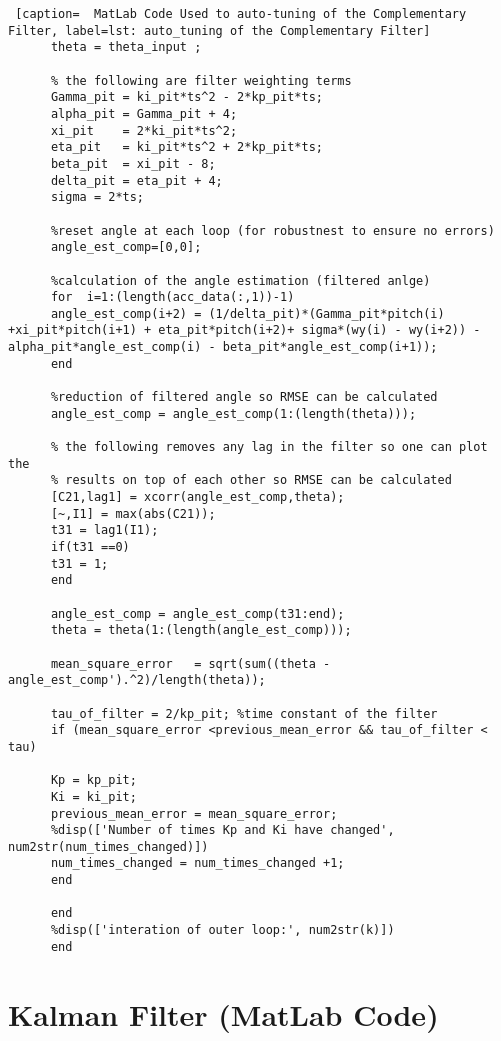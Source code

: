 \begin{lstlisting} [caption=  MatLab Code Used to auto-tuning of the Complementary Filter, label=lst: auto_tuning of the Complementary Filter]
      theta = theta_input ;  
      
      % the following are filter weighting terms 
      Gamma_pit = ki_pit*ts^2 - 2*kp_pit*ts;
      alpha_pit = Gamma_pit + 4;
      xi_pit    = 2*ki_pit*ts^2;
      eta_pit   = ki_pit*ts^2 + 2*kp_pit*ts;
      beta_pit  = xi_pit - 8;
      delta_pit = eta_pit + 4;
      sigma = 2*ts;
      
      %reset angle at each loop (for robustnest to ensure no errors)
      angle_est_comp=[0,0];
      
      %calculation of the angle estimation (filtered anlge)
      for  i=1:(length(acc_data(:,1))-1)
      angle_est_comp(i+2) = (1/delta_pit)*(Gamma_pit*pitch(i) +xi_pit*pitch(i+1) + eta_pit*pitch(i+2)+ sigma*(wy(i) - wy(i+2)) -alpha_pit*angle_est_comp(i) - beta_pit*angle_est_comp(i+1));
      end
      
      %reduction of filtered angle so RMSE can be calculated
      angle_est_comp = angle_est_comp(1:(length(theta)));
      
      % the following removes any lag in the filter so one can plot the
      % results on top of each other so RMSE can be calculated 
      [C21,lag1] = xcorr(angle_est_comp,theta);
      [~,I1] = max(abs(C21));
      t31 = lag1(I1);
      if(t31 ==0)
      t31 = 1; 
      end    
      
      angle_est_comp = angle_est_comp(t31:end);
      theta = theta(1:(length(angle_est_comp)));
      
      mean_square_error   = sqrt(sum((theta - angle_est_comp').^2)/length(theta));
      
      tau_of_filter = 2/kp_pit; %time constant of the filter
      if (mean_square_error <previous_mean_error && tau_of_filter < tau)
      
      Kp = kp_pit;
      Ki = ki_pit;
      previous_mean_error = mean_square_error;
      %disp(['Number of times Kp and Ki have changed', num2str(num_times_changed)])
      num_times_changed = num_times_changed +1;
      end
      
      end
      %disp(['interation of outer loop:', num2str(k)])  
      end
      \end{lstlisting}
      
      
   
   \newpage
   \section{Kalman Filter (MatLab Code)}
   
